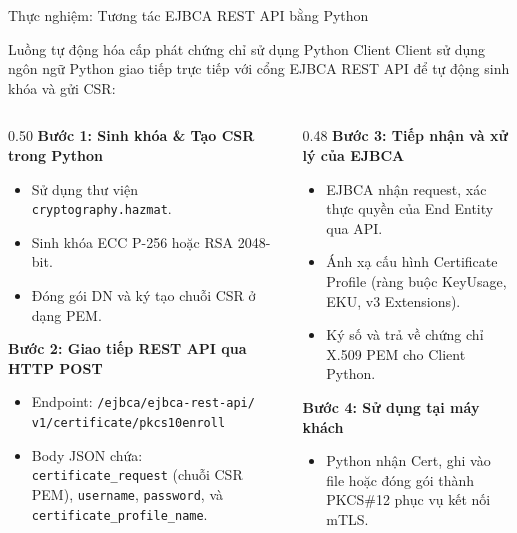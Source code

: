 \documentclass[10pt, aspectratio=169]{beamer}
\begin{document}
\begin{frame}{Thực nghiệm: Tương tác EJBCA REST API bằng Python}
    \begin{block}{Luồng tự động hóa cấp phát chứng chỉ sử dụng Python Client}
        Client sử dụng ngôn ngữ Python giao tiếp trực tiếp với cổng EJBCA REST API để tự động sinh khóa và gửi CSR:
    \end{block}
    \begin{columns}[onlytextwidth]
        \begin{column}{0.50\textwidth}
            \textbf{Bước 1: Sinh khóa \& Tạo CSR trong Python}
            \begin{itemize}
                \item Sử dụng thư viện \texttt{cryptography.hazmat}.
                \item Sinh khóa ECC P-256 hoặc RSA 2048-bit.
                \item Đóng gói DN và ký tạo chuỗi CSR ở dạng PEM.
            \end{itemize}
            \vspace{0.1cm}
            \textbf{Bước 2: Giao tiếp REST API qua HTTP POST}
            \begin{itemize}
                \item Endpoint: \texttt{/ejbca/ejbca-rest-api/}\\\texttt{v1/certificate/pkcs10enroll}
                \item Body JSON chứa: \texttt{certificate\_request} (chuỗi CSR PEM), \texttt{username}, \texttt{password}, và \texttt{certificate\_profile\_name}.
            \end{itemize}
        \end{column}
        \begin{column}{0.48\textwidth}
            \textbf{Bước 3: Tiếp nhận và xử lý của EJBCA}
            \begin{itemize}
                \item EJBCA nhận request, xác thực quyền của End Entity qua API.
                \item Ánh xạ cấu hình Certificate Profile (ràng buộc KeyUsage, EKU, v3 Extensions).
                \item Ký số và trả về chứng chỉ X.509 PEM cho Client Python.
            \end{itemize}
            \vspace{0.1cm}
            \textbf{Bước 4: Sử dụng tại máy khách}
            \begin{itemize}
                \item Python nhận Cert, ghi vào file hoặc đóng gói thành PKCS\#12 phục vụ kết nối mTLS.
            \end{itemize}
        \end{column}
    \end{columns}
\end{frame}
\end{document}
